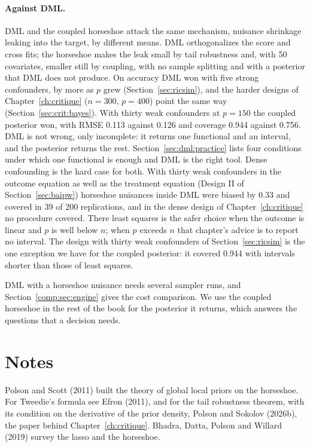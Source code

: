 \paragraph{Against DML.} DML and the coupled horseshoe attack the same mechanism, nuisance shrinkage leaking into the target, by different means. DML orthogonalizes the score and cross fits; the horseshoe makes the leak small by tail robustness and, with 50 covariates, smaller still by coupling, with no sample splitting and with a posterior that DML does not produce. On accuracy DML won with five strong confounders, by more as $p$ grew (Section~\ref{sec:ricsim}), and the harder designs of Chapter~\ref{ch:critique} ($n = 300$, $p = 400$) point the same way (Section~\ref{sec:crit:bayes}). With thirty weak confounders at $p = 150$ the coupled posterior won, with RMSE 0.113 against 0.126 and coverage 0.944 against 0.756. DML is not wrong, only incomplete: it returns one functional and an interval, and the posterior returns the rest. Section~\ref{sec:dml:practice} lists four conditions under which one functional is enough and DML is the right tool. Dense confounding is the hard case for both. With thirty weak confounders in the outcome equation as well as the treatment equation (Design II of Section~\ref{sec:baipw}) horseshoe nuisances inside DML were biased by 0.33 and covered in 39 of 200 replications, and in the dense design of Chapter~\ref{ch:critique} no procedure covered. There least squares is the safer choice when the outcome is linear and $p$ is well below $n$; when $p$ exceeds $n$ that chapter's advice is to report no interval. The design with thirty weak confounders of Section~\ref{sec:ricsim} is the one exception we have for the coupled posterior: it covered 0.944 with intervals shorter than those of least squares.

DML with a horseshoe nuisance needs several sampler runs, and Section~\ref{comp:sec:engine} gives the cost comparison. We use the coupled horseshoe in the rest of the book for the posterior it returns, which answers the questions that a decision needs.

\section*{Notes}

Polson and Scott (2011) built the theory of global local priors on the horseshoe. For Tweedie's formula see Efron (2011), and for the tail robustness theorem, with its condition on the derivative of the prior density, Polson and Sokolov (2026b), the paper behind Chapter~\ref{ch:critique}. Bhadra, Datta, Polson and Willard (2019) survey the lasso and the horseshoe.

